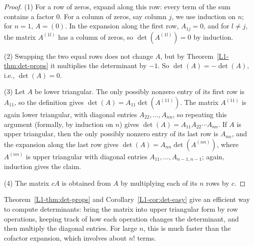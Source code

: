\begin{proof}
    (1) For a row of zeros, expand along this row: every term of the sum contains a factor $0$. For a column of zeros, say column $j$, we use induction on $n$; for $n = 1$, $A = (0)$. In the expansion along the first row, $A_{1j} = 0$, and for $l \neq j$, the matrix $A^{(1l)}$ has a column of zeros, so $\det(A^{(1l)}) = 0$ by induction.

    (2) Swapping the two equal rows does not change $A$, but by Theorem~\ref{L1-thm:det-props} it multiplies the determinant by $-1$. So $\det(A) = -\det(A)$, i.e., $\det(A) = 0$.

    (3) Let $A$ be lower triangular. The only possibly nonzero entry of its first row is $A_{11}$, so the definition gives $\det(A) = A_{11} \det(A^{(11)})$. The matrix $A^{(11)}$ is again lower triangular, with diagonal entries $A_{22}, \ldots, A_{nn}$, so repeating this argument (formally, by induction on $n$) gives $\det(A) = A_{11} A_{22} \cdots A_{nn}$. If $A$ is upper triangular, then the only possibly nonzero entry of its last row is $A_{nn}$, and the expansion along the last row gives $\det(A) = A_{nn}\det(A^{(nn)})$, where $A^{(nn)}$ is upper triangular with diagonal entries $A_{11}, \ldots, A_{n-1,n-1}$; again, induction gives the claim.

    (4) The matrix $cA$ is obtained from $A$ by multiplying each of its $n$ rows by $c$.
\end{proof}

Theorem~\ref{L1-thm:det-props} and Corollary~\ref{L1-cor:det-easy} give an efficient way to compute determinants: bring the matrix into upper triangular form by row operations, keeping track of how each operation changes the determinant, and then multiply the diagonal entries. For large $n$, this is much faster than the cofactor expansion, which involves about $n!$ terms.

